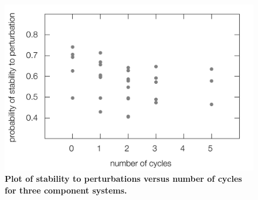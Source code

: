 \documentclass{amsart}
\theoremstyle{definition}
\theoremstyle{remark}
\numberwithin{equation}{section}
\begin{document}
\begin{figure}[!ht]
\centering
\noindent\includegraphics[width=0.8\columnwidth]{fig/cycle3x3.pdf}
\caption{{\bf Plot of stability to perturbations versus number of cycles for three component systems.} }
\label{fig:cycle3x3}
\end{figure}

\pagebreak
\end{document}
